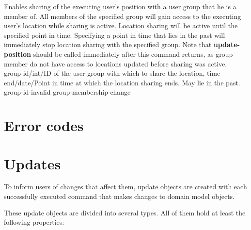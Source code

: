 \documentclass[parskip=full,11pt]{scrartcl}
\begin{document}
{Enables sharing of the executing user's position with a user group that he is
a member of.
All members of the specified group will gain access to the executing user's
location while sharing is active.
Location sharing will be active until the specified point in time.
Specifying a point in time that lies in the past will immediately stop location
sharing with the specified group.
Note that \textbf{update-position} should be called immediately after this
command returns, as group member do not have access to locations updated before
sharing was active.
}
{group-id/int/ID of the user group with which to share the location,
time-end/date/Point in time at which the location sharing ends.
May lie in the past.}
{}
{group-id-invalid}
{group-membership-change}

\section{Error codes}\label{sec:errorcodes}
\apiErrorTable

\section{Updates}
To inform users of changes that affect them, update objects are created with
each successfully executed command that makes changes to domain model objects.

These update objects are divided into several types. All of them hold at least
the following properties:




\end{document}
